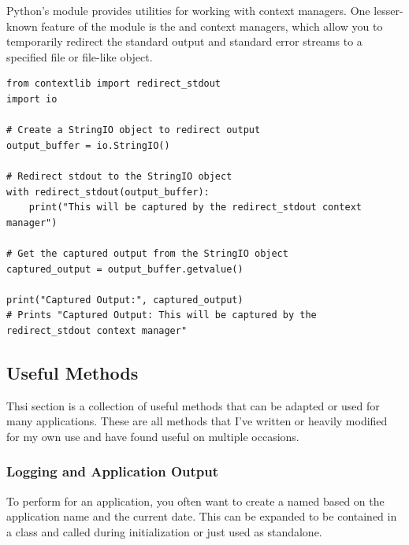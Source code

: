 Python's  module provides utilities for working with context managers. One lesser-known feature of the  module is the  and  context managers, which allow you to temporarily redirect the standard output and standard error streams to a specified file or file-like object.
\begin{lstlisting}
from contextlib import redirect_stdout
import io

# Create a StringIO object to redirect output
output_buffer = io.StringIO()

# Redirect stdout to the StringIO object
with redirect_stdout(output_buffer):
    print("This will be captured by the redirect_stdout context manager")

# Get the captured output from the StringIO object
captured_output = output_buffer.getvalue()

print("Captured Output:", captured_output)
# Prints "Captured Output: This will be captured by the redirect_stdout context manager"
\end{lstlisting}


























\subsection{Useful Methods}

Thsi section is a collection of useful methods that can be adapted or used for many applications. These are all methods that I've written or heavily modified for my own use and have found useful on multiple occasions.

\subsubsection{Logging and Application Output}

To perform  for an application, you often want to create a  named based on the application name and the current date. This can be expanded to be contained in a class and called during initialization or just used as standalone.

